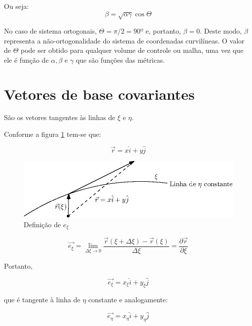 Ou seja:
\begin{equation}
    \label{eq:2.21}
    \beta = \sqrt{\alpha \gamma}\cos{\Theta}
\end{equation}

No caso de sistema ortogonais, $\Theta = \pi/2 = 90º$ e, portanto, $\beta = 0$. Deste modo, $\beta$ representa a não-ortogonalidade do sistema de coordenadas curvilíneas. O valor de $\Theta$ pode ser obtido para qualquer volume de controle ou malha, uma vez que ele é função de $\alpha, \beta$ e $\gamma$ que são funções das métricas.

\section{Vetores de base covariantes}
São os vetores tangentes às linhas de $\xi$ e $\eta$.

Conforme a figura \ref{fig:e_xi} tem-se que:

\begin{equation}
    \label{eq:2.22}
    \vec{r} = x \hat{i} + y \hat{j}
\end{equation}

\begin{figure}[h]
    \centering
    \includegraphics{fig/e_xi.eps}
    \caption{Definição de $e_\xi$}
    \label{fig:e_xi}
\end{figure}

\begin{equation}
    \label{eq:2.23}
    \vec{e_\xi} = \lim_{\Delta \xi \to 0} \frac{\vec{r}(\xi + \Delta \xi) - \vec{r}(\xi)}{\Delta \xi} = \frac{\partial \vec{r}}{\partial \xi}
\end{equation}

Portanto,

\begin{equation}
    \label{eq:2.24}
    \vec{e_\xi} = x_\xi \hat{i} + y_\xi \hat{j}
\end{equation}

que é tangente à linha de $\eta$ constante e analogamente:

\begin{equation}
    \label{eq:2.25}
    \vec{e_\eta} = x_\eta \hat{i} + y_\eta \hat{j}
\end{equation}

